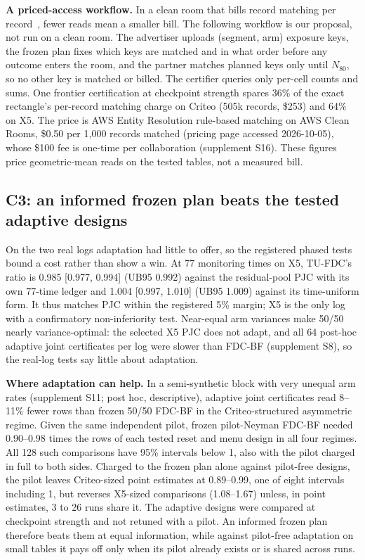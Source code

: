 \documentclass[sigconf,anonymous,review]{acmart}
\begin{document}
\textbf{A priced-access workflow.} In a clean room that bills record matching per record~\citep{awscleanrooms2026pricing}, fewer reads mean a smaller bill. The following workflow is our proposal, not run on a clean room. The advertiser uploads (segment, arm) exposure keys, the frozen plan fixes which keys are matched and in what order before any outcome enters the room, and the partner matches planned keys only until $N_{80}$, so no other key is matched or billed. The certifier queries only per-cell counts and sums. One frontier certification at checkpoint strength spares 36\% of the exact rectangle's per-record matching charge on Criteo (505k records, \$253) and 64\% on X5. The price is AWS Entity Resolution rule-based matching on AWS Clean Rooms, \$0.50 per 1,000 records matched (pricing page accessed 2026-10-05), whose \$100 fee is one-time per collaboration (supplement S16). These figures price geometric-mean reads on the tested tables, not a measured bill.

\subsection{C3: an informed frozen plan beats the tested adaptive designs}\label{sec:c3}

On the two real logs adaptation had little to offer, so the registered phased tests bound a cost rather than show a win. At 77 monitoring times on X5, TU-FDC's ratio is 0.985 [0.977, 0.994] (UB95 0.992) against the residual-pool PJC with its own 77-time ledger and 1.004 [0.997, 1.010] (UB95 1.009) against its time-uniform form. It thus matches PJC within the registered 5\% margin; X5 is the only log with a confirmatory non-inferiority test. Near-equal arm variances make 50/50 nearly variance-optimal: the selected X5 PJC does not adapt, and all 64 post-hoc adaptive joint certificates per log were slower than FDC-BF (supplement S8), so the real-log tests say little about adaptation.

\textbf{Where adaptation can help.} In a semi-synthetic block with very unequal arm rates (supplement S11; post hoc, descriptive), adaptive joint certificates read 8--11\% fewer rows than frozen 50/50 FDC-BF in the Criteo-structured asymmetric regime. Given the same independent pilot, frozen pilot-Neyman FDC-BF needed 0.90--0.98 times the rows of each tested reset and menu design in all four regimes. All 128 such comparisons have 95\% intervals below 1, also with the pilot charged in full to both sides. Charged to the frozen plan alone against pilot-free designs, the pilot leaves Criteo-sized point estimates at 0.89--0.99, one of eight intervals including 1, but reverses X5-sized comparisons (1.08--1.67) unless, in point estimates, 3 to 26 runs share it. The adaptive designs were compared at checkpoint strength and not retuned with a pilot. An informed frozen plan therefore beats them at equal information, while against pilot-free adaptation on small tables it pays off only when its pilot already exists or is shared across runs.
\end{document}
